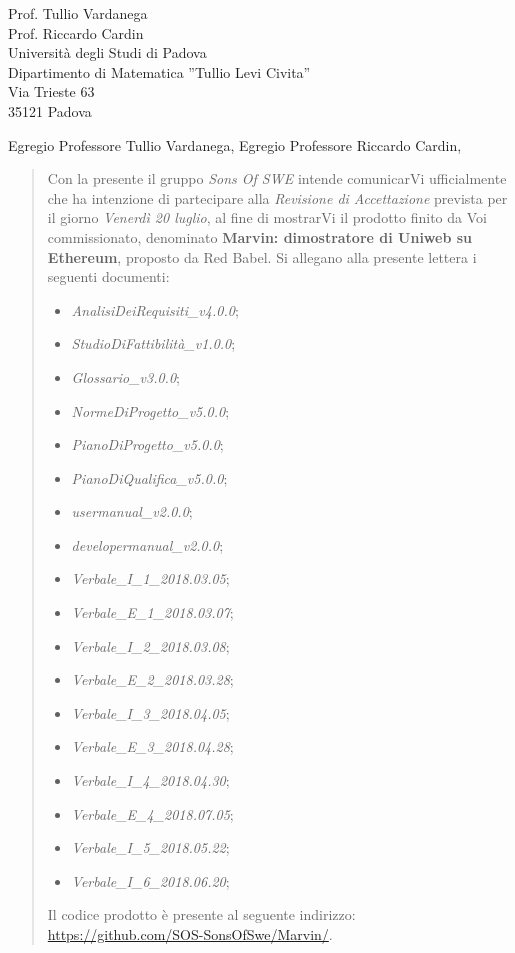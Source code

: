 \documentclass{letter}
\newcommand{\gruppo}{\emph{Sons Of SWE}}
\newcommand{\AdR}{\emph{AnalisiDeiRequisiti\_v4.0.0}}
\newcommand{\SdF}{\emph{StudioDiFattibilità\_v1.0.0}}
\newcommand{\NdP}{\emph{NormeDiProgetto\_v5.0.0}}
\newcommand{\PdP}{\emph{PianoDiProgetto\_v5.0.0}}
\newcommand{\PdQ}{\emph{PianoDiQualifica\_v5.0.0}}
\newcommand{\G}{\emph{Glossario\_v3.0.0}}
\newcommand{\MU}{\emph{usermanual\_v2.0.0}}
\newcommand{\MS}{\emph{developermanual\_v2.0.0}}
\newcommand{\VIuno}{\emph{Verbale\_I\_1\_2018.03.05}}
\newcommand{\VEuno}{\emph{Verbale\_E\_1\_2018.03.07}}
\newcommand{\VIdue}{\emph{Verbale\_I\_2\_2018.03.08}}
\newcommand{\VEdue}{\emph{Verbale\_E\_2\_2018.03.28}}
\newcommand{\VItre}{\emph{Verbale\_I\_3\_2018.04.05}}
\newcommand{\VEtre}{\emph{Verbale\_E\_3\_2018.04.28}}
\newcommand{\VIsei}{\emph{Verbale\_I\_6\_2018.06.20}}
\begin{document}
	

	
\begin{letter} {   
	\hfill Prof. Tullio Vardanega\\
	\hfill Prof. Riccardo Cardin\\
	\hfill Università degli Studi di Padova \\
	\hfill Dipartimento di Matematica ''Tullio Levi Civita'' \\
	\hfill Via Trieste 63 \\
	\hfill 35121 Padova \\
}

\date{}
\opening{Egregio Professore Tullio Vardanega, \newline Egregio Professore Riccardo Cardin,}
\begin{quotation}
	\noindent Con la presente il gruppo \textit{\gruppo} intende comunicarVi ufficialmente che ha intenzione di partecipare alla \emph{Revisione di Accettazione} prevista per il giorno \emph{Venerdì 20 luglio}, al fine di mostrarVi il prodotto finito da Voi commissionato, denominato \textbf{Marvin: dimostratore di Uniweb su Ethereum}, proposto da Red Babel.
	Si allegano alla presente lettera i seguenti documenti:
	\begin{itemize}
		\item \AdR{};
		\item \SdF{};
		\item \G{};
		\item \NdP{};
		\item \PdP{};
		\item \PdQ{};
		\item \MU{};
		\item \MS{};
		\item \VIuno{};
		\item \VEuno{};
		\item \VIdue{};
		\item \VEdue{};
		\item \VItre{};
		\item \VEtre{};
		\item \emph{Verbale\_I\_4\_2018.04.30};
		\item \emph{Verbale\_E\_4\_2018.07.05};
		\item \emph{Verbale\_I\_5\_2018.05.22};
		\item \VIsei{};
	\end{itemize}

	Il codice prodotto è presente al seguente indirizzo:
	\url{https://github.com/SOS-SonsOfSwe/Marvin/}.\\
	

\end{quotation}
\end{letter}
\end{document}
